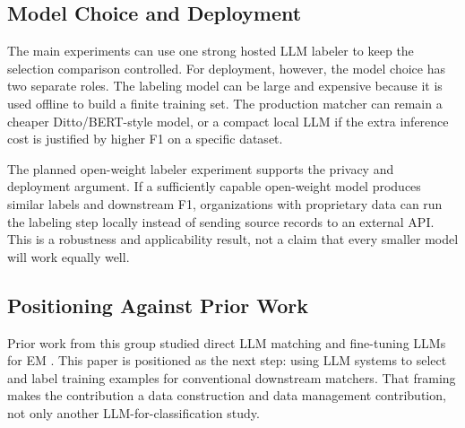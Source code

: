 \subsection{Model Choice and Deployment}

The main experiments can use one strong hosted LLM labeler to keep the selection comparison controlled. For deployment, however, the model choice has two separate roles. The labeling model can be large and expensive because it is used offline to build a finite training set. The production matcher can remain a cheaper Ditto/BERT-style model, or a compact local LLM if the extra inference cost is justified by higher F1 on a specific dataset.

The planned open-weight labeler experiment supports the privacy and deployment argument. If a sufficiently capable open-weight model produces similar labels and downstream F1, organizations with proprietary data can run the labeling step locally instead of sending source records to an external API. This is a robustness and applicability result, not a claim that every smaller model will work equally well.

\subsection{Positioning Against Prior Work}

Prior work from this group studied direct LLM matching and fine-tuning LLMs for EM \cite{peeters2025llmem,steiner2025finetuning}. This paper is positioned as the next step: using LLM systems to select and label training examples for conventional downstream matchers. That framing makes the contribution a data construction and data management contribution, not only another LLM-for-classification study.
